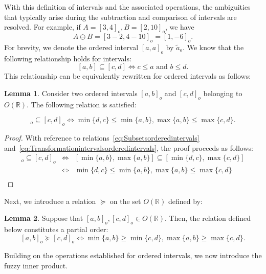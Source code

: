 \documentclass[preprint,12pt]{elsarticle}
\newcommand{\RR}{\mathbb R}
\theoremstyle{definition}
\newtheorem{lemma}{Lemma}[section]
\begin{document}
With this definition of intervals and the associated operations, the ambiguities that typically arise during the subtraction and comparison of intervals are resolved.
For example, if $A=[3,4]_o,B=[2,10]_o$, we have\\
\[
A \ominus B = [3-2, 4-10]_o = [1, -6]_o.
\]
For brevity, we denote the ordered interval $[a,a]_o$ by $\tilde{a}_o$.
We know that the following relationship holds for intervals:
\begin{equation}\label{eq:Subsetsorderedintervals}
	[a,b] \subseteq [c,d] \iff c \leq a \text{ and } b \leq d.
\end{equation}
This relationship can be equivalently rewritten for ordered intervals as follows:

\begin{lemma}
	Consider two ordered intervals $[a,b]_o$ and $[c,d]_o$ belonging to $O(\mathbb{R})$. 
	The following relation is satisfied:
	
	\begin{equation}
		[a,b]_o\subseteq[c,d]_o\iff \min\{d,c\}\leq\min\{a,b\},\max\{a,b\}\leq\max\{c,d\}.
	\end{equation}
	\begin{proof}
		With reference to relations~\eqref{eq:Subsetsorderedintervals} and~\eqref{eq:Transformationintervalsorderedintervals}, 
		the proof proceeds as follows:
		\begin{eqnarray*}
			[a,b]_o\subseteq[c,d]_o&\iff&
			[\min\{a,b\},\max\{a,b\}]\subseteq[\min\{d,c\},\max\{c,d\}]\\ &\iff&
			\min\{d,c\}\leq\min\{a,b\},\max\{a,b\}\leq\max\{c,d\}\\
		\end{eqnarray*}	
	\end{proof}
\end{lemma}
Next, we introduce a relation $\succeq$ on the set $O(\mathbb{R})$ defined by:
\begin{lemma}
	Suppose that $[a,b]_o,[c,d]_o\in O(\RR)$. Then, the relation defined below constitutes a partial order:
	\[[a,b]_o\succeq[c,d]_o\iff \min\{a,b\}\geq \min\{c,d\} , \max\{a,b\}\geq \max\{c,d\}.\]
\end{lemma}
Building on the operations established for ordered intervals, we now introduce the fuzzy inner product.
\allowdisplaybreaks
\end{document}
